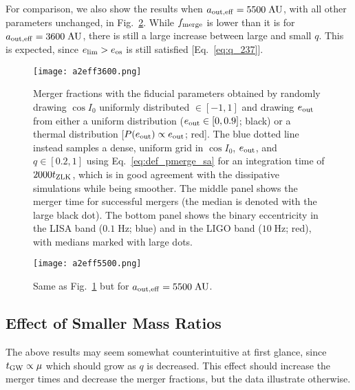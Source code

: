 \documentclass[
        fleqn,
        usenatbib,
    ]{mnras}
\begin{document}
For comparison, we also show the results when $a_{\rm out, eff} =
5500\;\mathrm{AU}$, with all other parameters unchanged, in
Fig.~\ref{fig:popsynth5500}. While $f_{\rm merge}$ is lower than it is for
$a_{\rm out, eff} = 3600\;\mathrm{AU}$, there is still a large increase between
large and small $q$. This is expected, since $e_{\lim} > e_{\rm os}$ is still
satisfied [Eq.~\eqref{eq:q_237}].
\begin{figure}
    \centering
    \texttt{[image: a2eff3600.png]}
    \caption{Merger fractions with the fiducial parameters obtained by randomly
    drawing $\cos I_0$ uniformly distributed $\in [-1, 1]$ and drawing $e_{\rm
    out}$ from either a uniform distribution ($e_{\rm out} \in [0, 0.9]$; black)
    or a thermal distribution [$P(e_{\rm out}) \propto e_{\rm out}$; red]. The
    blue dotted line instead samples a dense, uniform grid in $\cos I_0$,
    $e_{\rm out}$, and $q \in [0.2, 1]$ using Eq.~\eqref{eq:def_pmerge_sa} for
    an integration time of $2000 t_{\rm ZLK}$, which is in good agreement with
    the dissipative simulations while being smoother. The middle panel shows the
    merger time for successful mergers (the median is denoted with the large
    black dot). The bottom panel shows the binary eccentricity in the LISA band
    ($0.1\;\mathrm{Hz}$; blue) and in the LIGO band ($10 \;\mathrm{Hz}$; red),
    with medians marked with large dots. }\label{fig:popsynth}
\end{figure}
\begin{figure}
    \centering
    \texttt{[image: a2eff5500.png]}
    \caption{Same as Fig.~\ref{fig:popsynth} but for $a_{\rm out, eff} =
    5500\;\mathrm{AU}$. }\label{fig:popsynth5500}
\end{figure}

\subsection{Effect of Smaller Mass Ratios}

The above results may seem somewhat counterintuitive at first glance, since
$t_{\rm GW} \propto \mu$ which should grow as $q$ is decreased. This effect
should increase the merger times and decrease the merger fractions, but the data
illustrate otherwise.
\end{document}
